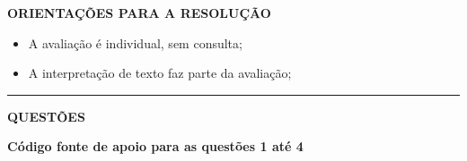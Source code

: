 \documentclass[12pt,a4paper]{article}
\begin{document}
\textbf{ORIENTAÇÕES PARA A RESOLUÇÃO}  

\begin{itemize}
    \item A avaliação é individual, sem consulta;
    \item A interpretação de texto faz parte da avaliação;
\end{itemize}

\vspace{0.5cm}

\begin{center}
    \rule{\textwidth}{0.4pt}
    \textbf{QUESTÕES}
\end{center}

\vspace{0.5cm} 

\textbf{Código fonte de apoio para as questões 1 até 4}
\end{document}
